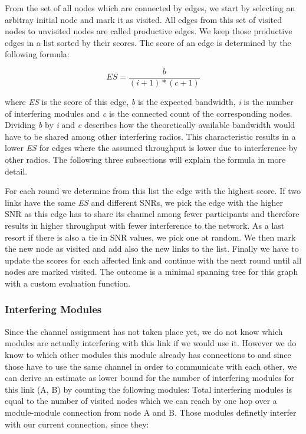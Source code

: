       From the set of all nodes which are connected by edges, we start by selecting an arbitray initial node and mark it as visited. 
      All edges from this set of visited nodes to unvisited nodes are called productive edges.
      We keep those productive edges in a list sorted by their scores. The score of an edge is determined by the following formula:
      
      \begin{equation} \label{eq:edgescore}
	ES=\frac{b}{(i + 1 )* (c + 1)}
      \end{equation}
      
      where \textit{ES} is the score of this edge, \textit{b} is the expected bandwidth, \textit{i} is the number of 
      interfering modules and \textit{c} is the connected count of the corresponding nodes. 
      Dividing \textit{b} by \textit{i} and \textit{c} describes how the theoretically available bandwidth would have to be shared among other interfering radios.
      This characteristic results in a lower \textit{ES} for edges where the assumed throughput is lower due to interference by other radios.
      The following three subsections will explain the formula in more detail.
      
      For each round we determine from this list the edge with the highest score. If two links have the same \textit{ES} and different SNRs, we pick the edge with
      the higher \ac{SNR} as this edge has to share its channel among fewer participants and therefore results in higher throughput with fewer interference to the network.
      As a last resort if there is also a tie in \ac{SNR} values, we pick one at random. We then mark the new node as visited and add also the new links to the list.
      Finally we have to update the scores for each affected link and continue with the next round until all nodes are marked visited.
      The outcome is a minimal spanning tree for this graph with a custom evaluation function.
      
\newpage
      
      \subsubsection{Interfering Modules}
	Since the channel assignment has not taken place yet, we do not know which modules are actually interfering with this link if we would use it.
	However we do know to which other modules this module already has connections to and since those have to use the same channel in order to communicate with each
	other, we can derive an estimate as lower bound for the number of interfering modules for this link (A, B) by counting the following modules:
	Total interfering modules is equal to the number of visited nodes which we can reach by one hop over a module-module connection from node A and B.
	Those modules definetly interfer with our current connection, since they:
	
